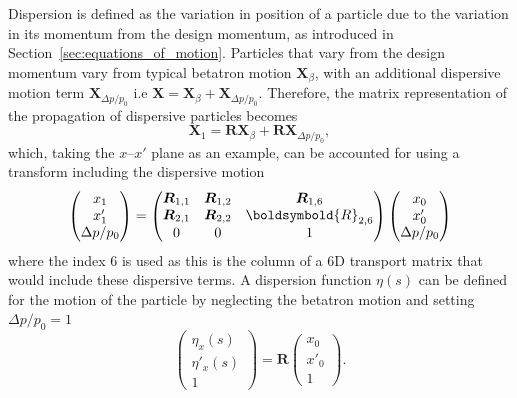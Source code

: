 \documentclass[../main.tex]{subfiles}
\begin{document}
Dispersion is defined as the variation in position of a particle due to the variation in its momentum from the design momentum, as introduced in Section~\ref{sec:equations_of_motion}. Particles that vary from the design momentum vary from typical betatron motion $\boldsymbol{X}_{\beta}$, with an additional dispersive motion term $\boldsymbol{X}_{\Delta p/p_{0}}$ i.e $\boldsymbol{X} = \boldsymbol{X}_{\beta} + \boldsymbol{X}_{\Delta p/p_{0}}$. Therefore, the matrix representation of the propagation of dispersive particles becomes
\begin{equation}
\boldsymbol{X}_{1} = \boldsymbol{R}\boldsymbol{X}_{\beta} + \boldsymbol{R}\boldsymbol{X}_{\Delta p/p_{0}},
\label{eq:dispersive_transport_matrix_propagation}    
\end{equation}
which, taking the $x$--$x'$ plane as an example, can be accounted for using a transform including the dispersive motion
\begin{equation}
\begin{pmatrix}
x_{1} \\
x'_{1} \\
\Delta p /p_{0}
\end{pmatrix}
=
\begin{pmatrix}
\boldsymbol{R}_{1,1} & \boldsymbol{R}_{1,2} & \boldsymbol{R}_{1,6} \\
\boldsymbol{R}_{2,1} & \boldsymbol{R}_{2,2} & \boldsymbold{R}_{2,6} \\
0 & 0 & 1
\end{pmatrix}
\begin{pmatrix}
x_{0} \\
x'_{0} \\
\Delta p / p_{0} 
\end{pmatrix}
\label{eq:dispersive_transport_simplified}
\end{equation}
where the index 6 is used as this is the column of a 6D transport matrix that would include these dispersive terms. A dispersion function $\eta\left(s\right)$ can be defined for the motion of the particle by neglecting the betatron motion and setting $\Delta p/p_{0} =1$
\begin{equation}
\begin{pmatrix}
\eta_{x}\left(s\right) \\
\eta'_{x}\left(s\right) \\
1
\end{pmatrix}
=\boldsymbol{R}
\begin{pmatrix}
x_{0} \\
x'_{0} \\
1
\end{pmatrix}.
\label{eq:dispersion_function}    
\end{equation}
\end{document}
